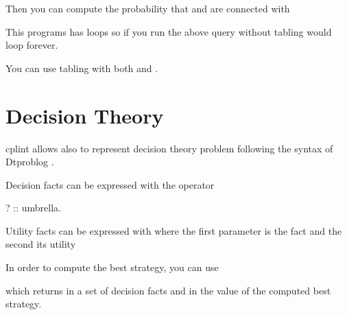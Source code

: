 \documentclass[letterpaper,10pt,english]{sphinxmanual}
\begin{document}
Then you can compute the probability that  and  are connected with

\begin{sphinxVerbatim}[commandchars=\\\{\}]
\end{sphinxVerbatim}

This programs has loops so if you run the above query without tabling  would loop forever.

You can use tabling with both  and .


\section{Decision Theory}
\label{\detokenize{index:decision-theory}}
cplint allows also to represent decision theory problem following the syntax of Dtproblog .

Decision facts can be expressed with the operator 

\begin{sphinxVerbatim}[commandchars=\\\{\}]
? :: umbrella.
\end{sphinxVerbatim}

Utility facts can be expressed with  where the first parameter is the fact and the second its utility

\begin{sphinxVerbatim}[commandchars=\\\{\}]
\end{sphinxVerbatim}

In order to compute the best strategy, you can use 

\begin{sphinxVerbatim}[commandchars=\\\{\}]
\end{sphinxVerbatim}

which returns in  a set of decision facts and in  the value of the computed best strategy.
\end{document}
